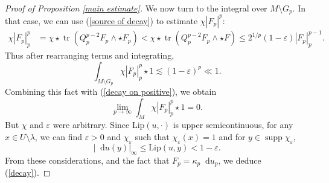 \documentclass[reqno,11pt]{amsart}
\newcommand*\dif{\mathop{}\!\mathrm{d}}
\DeclareMathOperator{\supp}{supp}
\DeclareMathOperator{\tr}{tr}
\newcommand{\Lip}{\mathrm{Lip}}
\theoremstyle{definition}
\numberwithin{equation}{section}
\begin{document}
\begin{proof}[Proof of Proposition \ref{main estimate}]
We now turn to the integral over $M \setminus G_p$.
In that case, we can use (\ref{source of decay}) to estimate $\chi |F_p|^p$:
\begin{align*}
\chi |F_p|_p^p &= \chi \star \tr(Q_p^{p - 2} F_p \wedge \star F_p) < \chi \star \tr(Q_p^{p - 2} F_p \wedge \star F) \leq 2^{1/p} (1 - \varepsilon) |F_p|_p^{p - 1}.
\end{align*}
Thus after rearranging terms and integrating,
$$\int_{M \setminus G_p} \chi |F_p|_p^p \star 1 \lesssim (1 - \varepsilon)^p \ll 1.$$
Combining this fact with (\ref{decay on positive}), we obtain 
$$\lim_{p \to \infty} \int_M \chi |F_p|_p^p \star 1 = 0.$$
But $\chi$ and $\varepsilon$ were arbitrary.
Since $\Lip(u, \cdot)$ is upper semicontinuous, for any $x \in U \setminus \lambda$, we can find $\varepsilon > 0$ and $\chi_\varepsilon$ such that $\chi_\varepsilon(x) = 1$ and for $y \in \supp \chi_\varepsilon$,
$$|\dif u(y)|_\infty \leq \Lip(u, y) < 1 - \varepsilon.$$
From these considerations, and the fact that $F_p = \kappa_p \dif u_p$, we deduce (\ref{decay}).
\end{proof}

\end{document}
